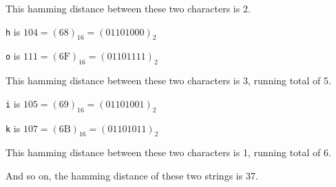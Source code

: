 \documentclass[12pt]{book}
\begin{document}
  This hamming distance between these two characters is 2.

  \texttt{h} is $104 = (68)_{16} = (01101000)_{2}$

  \texttt{o} is $111 = (6\text{F})_{16} = (01101111)_{2}$

  This hamming distance between these two characters is 3, running total of 5.

  \texttt{i} is $105 = (69)_{16} = (01101001)_{2}$

  \texttt{k} is $107 = (6\text{B})_{16} = (01101011)_{2}$

  This hamming distance between these two characters is 1, running total of 6.

  And so on, the hamming distance of these two strings is 37.
\end{document}
